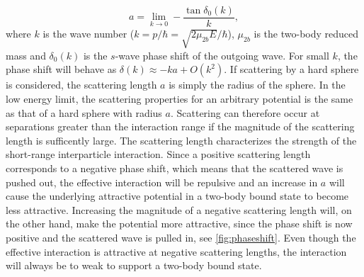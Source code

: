 \begin{equation} \label{eq:2}
a = \lim_{k \to 0} -\frac{\tan\delta_0(k)}{k},
\end{equation}
where $k$ is the wave number ($k=p/\hbar = \sqrt{2\mu_{2b} E}/\hbar$), $\mu_{2b}$ is the two-body reduced mass and $\delta_0(k)$ is the $s$-wave phase shift of the outgoing wave. For small $k$, the phase shift will behave as $\delta(k)\approx-ka + O(k^2)$. If scattering by a hard sphere is considered, the scattering length $a$ is simply the radius of the sphere. In the low energy limit, the scattering properties for an arbitrary potential is the same as that of a hard sphere with radius $a$. Scattering can therefore occur at separations greater than the interaction range if the magnitude of the scattering length is sufficently large. The scattering length characterizes the strength of the short-range interparticle interaction. Since a positive scattering length corresponds to a negative phase shift, which means that the scattered wave is pushed out, the effective interaction will be repulsive and an increase in $a$ will cause the underlying attractive potential in a two-body bound state to become less attractive. Increasing the magnitude of a negative scattering length will, on the other hand, make the potential more attractive, since the phase shift is now positive and the scattered wave is pulled in, see \cref{fig:phaseshift}. Even though the effective interaction is attractive at negative scattering lengths, the interaction will always be to weak to support a two-body bound state.  

